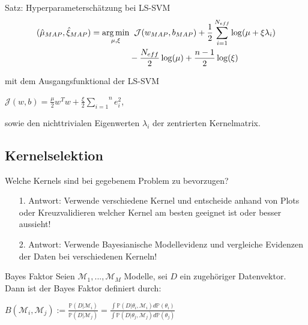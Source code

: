 \documentclass{beamer}
\begin{document}
{\begin{frame}
\begin{block}{Satz: Hyperparameterschätzung bei LS-SVM}
\begin{align}
(\hat{\mu}_{MAP}, \hat{\xi}_{MAP}) = \underset{\mu, \xi}{\arg \min} & \hspace{0.2cm}\mathcal{J}(w_{MAP}, b_{MAP}) + \frac{1}{2}\sum_{i=1}^{N_{eff}}\log(\mu + \xi \lambda_i) \\
&- \frac{N_{eff}}{2}\log(\mu) + \frac{n -1 }{2}\log(\xi)
\end{align}



mit dem Ausgangsfunktional der LS-SVM 
\begin{center}
$\mathcal{J}(w,b) = \frac{\mu}{2}w^T w + \frac{\xi}{2}\overset{n}{\underset{i=1}{\sum}} e_i ^2$,
\end{center}
sowie den nichttrivialen Eigenwerten $\lambda_i$ der zentrierten Kernelmatrix.
\end{block}



\end{frame}

\subsection{Kernelselektion}

\begin{frame}
Welche Kernels sind bei gegebenem Problem zu bevorzugen?\\
	\begin{itemize}
		\item[1.]Antwort: Verwende verschiedene Kernel und entscheide anhand von Plots oder Kreuzvalidieren welcher Kernel am besten geeignet ist oder besser aussieht!
		\item[2.]Antwort: Verwende Bayesianische Modellevidenz und vergleiche Evidenzen der Daten bei verschiedenen Kerneln!
	\end{itemize}
\end{frame}

\begin{frame}

\begin{block}{Bayes Faktor}
Seien $\mathcal{M}_1,...,\mathcal{M}_M$ Modelle, sei $D$ ein zugehöriger Datenvektor.
Dann ist der Bayes Faktor definiert durch:
\begin{center}
$B(\mathcal{M}_i, \mathcal{M}_j):= \frac{\mathbb{P}(D\vert \mathcal{M}_i)}{\mathbb{P}(D\vert \mathcal{M}_j)} = \frac{\int\mathbb{P}(D\vert \theta_i, \mathcal{M}_i )d\mathbb{P}(\theta_i)}{\int\mathbb{P}(D\vert \theta_j, \mathcal{M}_j )d\mathbb{P}(\theta_j)}$
\end{center}
\end{block}


\end{frame}}
\end{document}
